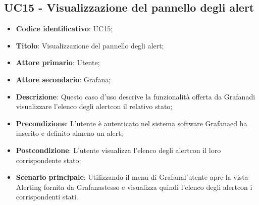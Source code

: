 \subsection{UC15 - Visualizzazione del pannello degli alert}
\begin{itemize}
	\item \textbf{Codice identificativo}: UC15;
	\item \textbf{Titolo}: Visualizzazione del pannello degli alert\glo;
	\item \textbf{Attore primario}: Utente;
	\item \textbf{Attore secondario}: Grafana\glo;
	\item \textbf{Descrizione}: Questo caso d'uso descrive la funzionalità offerta da Grafana\glosp di visualizzare l'elenco degli alert\glosp con il relativo stato;
	\item \textbf{Precondizione}: L'utente è autenticato nel sistema software Grafana\glosp ed ha inserito e definito almeno un alert\glo;
	\item \textbf{Postcondizione}: L'utente visualizza l'elenco degli alert\glosp con il loro corrispondente stato;
	\item \textbf{Scenario principale}: Utilizzando il menu di Grafana\glosp l'utente apre la vista Alerting fornita da Grafana\glosp stesso e visualizza quindi l'elenco degli alert\glosp con i corrispondenti stati.
\end{itemize} 
